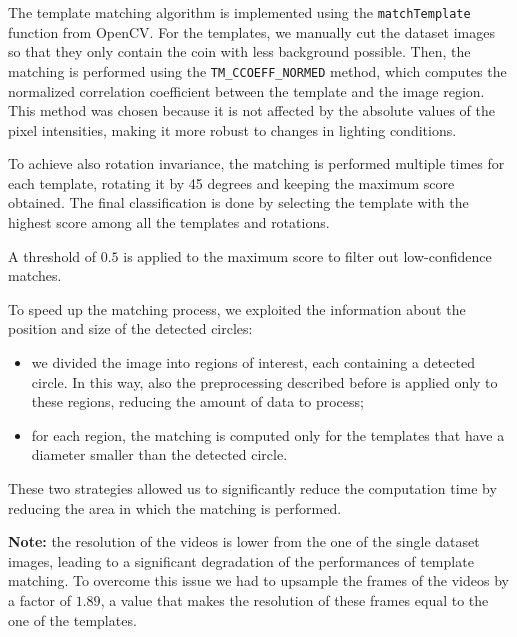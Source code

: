
The template matching algorithm is implemented using the \texttt{matchTemplate} function from OpenCV.
For the templates, we manually cut the dataset images so that they only contain the coin with less background possible.
Then, the matching is performed using the \texttt{TM\_CCOEFF\_NORMED} method, which computes the normalized correlation coefficient between the template and the image region.
This method was chosen because it is not affected by the absolute values of the pixel intensities, making it more robust to changes in lighting conditions.

To achieve also rotation invariance, the matching is performed multiple times for each template, rotating it by 45 degrees and keeping the maximum score obtained.
The final classification is done by selecting the template with the highest score among all the templates and rotations.

A threshold of $0.5$ is applied to the maximum score to filter out low-confidence matches.

To speed up the matching process, we exploited the information about the position and size of the detected circles:
\begin{itemize}
    \item we divided the image into regions of interest, each containing a detected circle. In this way, also the preprocessing described before is applied only to these regions, reducing the amount of data to process;
    \item for each region, the matching is computed only for the templates that have a diameter smaller than the detected circle.
\end{itemize}
These two strategies allowed us to significantly reduce the computation time by reducing the area in which the matching is performed.

\textbf{Note:} the resolution of the videos is lower from the one of the single dataset images, leading to a significant degradation of the performances of template matching. 
To overcome this issue we had to upsample the frames of the videos by a factor of $1.89$, a value that makes the resolution of these frames equal to the one of the templates.